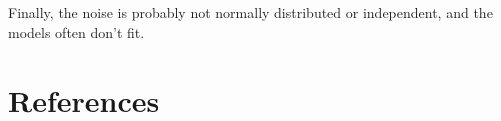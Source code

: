 \documentclass[preprint,authoryear,12pt]{elsarticle}
\begin{document}
Finally, the noise is probably not normally distributed or independent, and the
 models often don't fit.






%
%
%
%
\section*{References}



\end{document}
